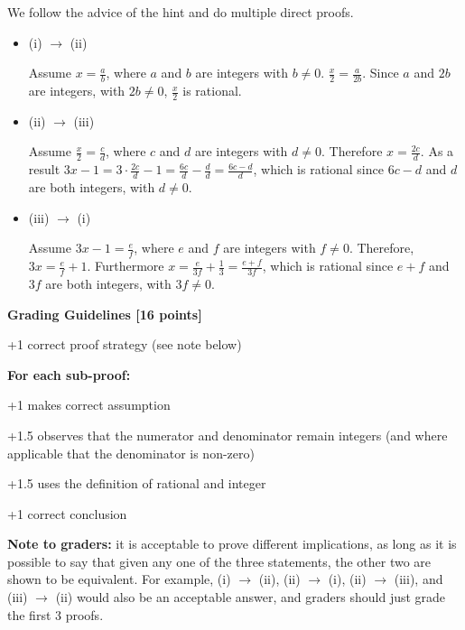\documentclass[12pt]{exam}
\begin{document}
\begin{solution}
We follow the advice of the hint and do multiple direct proofs.
\begin{itemize}
    \item (i) $\rightarrow$ (ii)
    
    Assume $x = \frac{a}{b}$, where $a$ and $b$ are integers with $b \neq 0$. $\frac{x}{2} = \frac{a}{2b}$. Since $a$ and $2b$ are integers, with $2b \neq 0$, $\frac{x}{2}$ is rational.
    
    \item (ii) $\rightarrow$ (iii)
    
    Assume $\frac{x}{2} = \frac{c}{d}$, where $c$ and $d$ are integers with $d \neq 0$. Therefore $x = \frac{2c}{d}$. As a result $3x-1 = 3\cdot\frac{2c}{d}-1 = \frac{6c}{d}-\frac{d}{d} = \frac{6c-d}{d}$, which is rational since $6c-d$ and $d$ are both integers, with $d \neq 0$.

    \item (iii) $\rightarrow$ (i)
    
    Assume $3x-1 = \frac{e}{f}$, where $e$ and $f$ are integers with $f \neq 0$. Therefore, $3x = \frac{e}{f} + 1$. Furthermore $x = \frac{e}{3f} + \frac 13 = \frac{e+f}{3f}$, which is rational since $e+f$ and $3f$ are both integers, with $3f \neq 0$.
\end{itemize}
\textbf{Grading Guidelines [16 points]}

\begin{guidelines}
    \item +1 correct proof strategy (see note below)
\end{guidelines}
\textbf{For each sub-proof:}
\begin{guidelines}
    \item +1 makes correct assumption
    \item +1.5 observes that the numerator and denominator remain integers (and where applicable that the denominator is non-zero)
    \item +1.5 uses the definition of rational and integer
    \item +1 correct conclusion
\end{guidelines}
\textbf{Note to graders:} it is acceptable to prove different implications, as long as it is possible to say that given any one of the three statements, the other two are shown to be equivalent. For example, (i) $\to$ (ii), (ii) $\to$ (i), (ii) $\to$ (iii), and (iii) $\to$ (ii) would also be an acceptable answer, and graders should just grade the first 3 proofs.
\end{solution}
\end{document}
